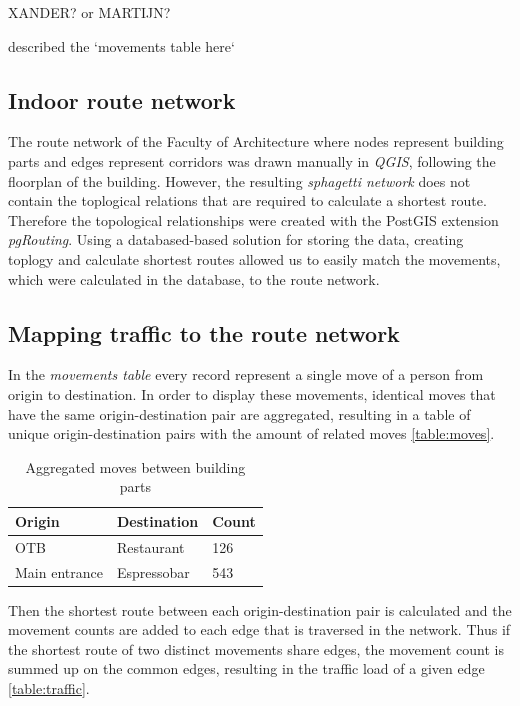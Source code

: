 XANDER? or MARTIJN?

described the `movements table here`

\subsection{Indoor route network}
The route network of the Faculty of Architecture where nodes represent building
parts and edges represent corridors was drawn manually in \textit{QGIS},
following the floorplan of the building. However, the resulting \textit{sphagetti network}
does not contain the toplogical relations that are required to calculate
a shortest route. Therefore the topological relationships were created with the
PostGIS extension \textit{pgRouting}. Using a databased-based solution for
storing the data, creating toplogy and calculate shortest routes allowed us to
easily match the movements, which were calculated in the database, to the route
network.

\subsection{Mapping traffic to the route network}
In the \textit{movements table} every record represent a single move of a person
from origin to destination. In order to display these movements, identical moves
that have the same origin-destination pair are aggregated, resulting in a table
of unique origin-destination pairs with the amount of related moves
\autoref{table:moves}.

\begin{table}[H]
\centering
\caption{Aggregated moves between building parts}
\label{table:moves}
\begin{tabular}{@{}lll@{}}
\toprule
Origin        & Destination & Count \\ \midrule
OTB           & Restaurant  & 126   \\
Main entrance & Espressobar & 543   \\ \bottomrule
\end{tabular}
\end{table}

Then the shortest route between each origin-destination pair is calculated and
the movement counts are added to each edge that is traversed in the network.
Thus if the shortest route of two distinct movements share edges, the movement
count is summed up on the common edges, resulting in the traffic load of a given
edge \autoref{table:traffic}.

